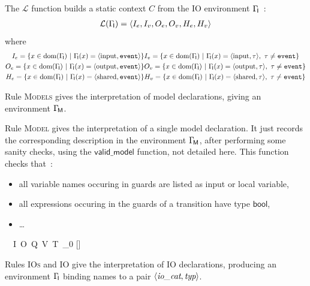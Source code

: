 The $\mathcal{L}$ function builds a static context $C$ from the IO environment $\Gamma_{\!\mathsf{I}}$~:
\begin{eqnarray*}
\mathcal{L}(\Gamma_{\!\mathsf{I}}) = \langle I_e, I_v, O_e, O_v, H_e, H_v\rangle
\end{eqnarray*}
\noindent
where
\begin{eqnarray*}
I_e=\{x \in \text{dom}(\senv{I}) ~|~ \senv{I}(x)=\ttuple{\cat{input}}{\tm{event}}\} &
I_v=\{x \in \text{dom}(\senv{I}) ~|~ \senv{I}(x)=\ttuple{\cat{input}}{\tau},\ \tau\not=\tm{event}\}\\
O_e=\{x \in \text{dom}(\senv{I}) ~|~ \senv{I}(x)=\ttuple{\cat{output}}{\tm{event}}\} &
O_v=\{x \in \text{dom}(\senv{I}) ~|~ \senv{I}(x)=\ttuple{\cat{output}}{\tau},\ \tau\not=\tm{event}\}\\
H_e=\{x \in \text{dom}(\senv{I}) ~|~ \senv{I}(x)=\ttuple{\cat{shared}}{\tm{event}}\} &
H_v=\{x \in \text{dom}(\senv{I}) ~|~ \senv{I}(x)=\ttuple{\cat{shared}}{\tau},\ \tau\not=\tm{event}\}
\end{eqnarray*}

\medskip\step
Rule \textsc{Models} gives the interpretation of model declarations, giving an environment
$\Gamma_{\!\mathsf{M}}$. 

{ \xrightarrow{} }

\medskip\step
Rule \textsc{Model} gives the interpretation of a single model declaration. It just records the
corresponding description in the environment $\Gamma_{\!\mathsf{M}}$, after performing some sanity checks, using
the $\mathsf{valid\_model}$ function, not detailed here. This function checks that~:
\begin{itemize}
\item all variable names occuring in guards are listed as input or local variable,
\item all expressions occuring in the guards of a transition have type $\mathsf{bool}$,
\item \ldots {}
\end{itemize}

{~~I~O~Q~V~T~\tau_0 \xrightarrow{} [\mapsto\mm]}

\medskip\step
Rules \textsc{IOs} and \textsc{IO} give the interpretation of IO declarations, producing an environment
$\Gamma_{\!\mathsf{I}}$ binding names to a pair $\langle\emph{io\_cat}, \emph{typ}\rangle$.

